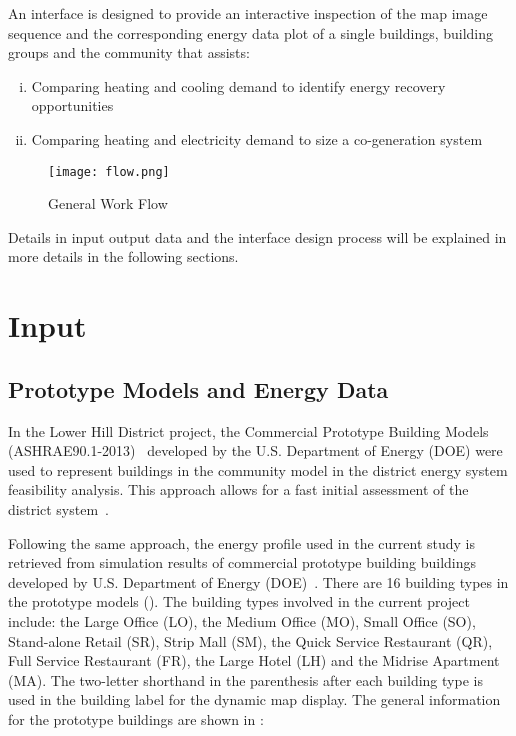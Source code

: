 An interface is designed to provide an interactive inspection of the
map image sequence and the corresponding energy data plot of a single
buildings, building groups and the community that assists:
\begin{enumerate}[i.]
\item Comparing heating and cooling demand to identify energy recovery
  opportunities
\item Comparing heating and electricity demand to size a co-generation
  system
\end{enumerate}

\begin{figure}[h!]
  \centering
  \texttt{[image: flow.png]}
  \caption[General Work Flow]{General Work Flow}
  \label{fig:flow}
\end{figure}

Details in input output data and the interface design process will be
explained in more details in the following sections.
\newpage
\section{Input}
\subsection{Prototype Models and Energy Data}
In the Lower Hill District project, the Commercial Prototype Building
Models (ASHRAE90.1-2013)~\cite{DOEprototype} developed by the U.S.
Department of Energy (DOE) were used to represent buildings in the
community model in the district energy system feasibility
analysis. This approach allows for a fast initial assessment of the
district system~\cite{baird2014}.

Following the same approach, the energy profile used in the current
study is retrieved from simulation results of commercial prototype
building buildings developed by U.S. Department of Energy
(DOE)~\cite{DOEprototype}. There are 16 building types in the prototype
models (). The building types involved in the
current project include: the Large Office (LO), the Medium Office (MO), Small
Office (SO), Stand-alone Retail (SR), Strip Mall (SM), the Quick Service
Restaurant (QR), Full Service Restaurant (FR), the Large Hotel (LH) and
the Midrise Apartment (MA). The two-letter shorthand in the parenthesis
after each building type is used in the building label for the dynamic
map display. The general information for the prototype buildings are
shown in :

